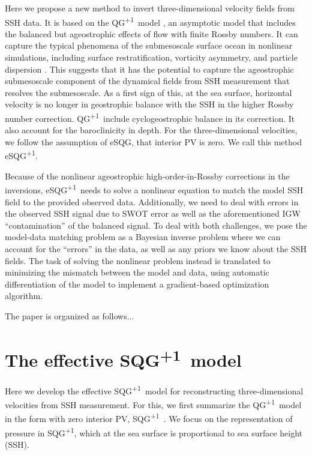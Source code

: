 \documentclass[11pt,letterpaper]{article}
\newcommand{\pl}{\textsuperscript{+1}}
\begin{document}
Here we propose a new method to invert three-dimensional velocity fields from SSH data. It is based on the QG\pl~model \citep{Vallis_96a,MurakiEtAl_99}, an asymptotic model that includes the balanced but ageostrophic effects of flow with finite Rossby numbers. It can capture the typical phenomena of the submesoscale surface ocean in nonlinear simulations, including surface restratification, vorticity asymmetry, and particle dispersion \citep{HakimEtAl_02,MaaloulyEtAl_23,DuEtAl_24}. This suggests that it has the potential to capture the ageostrophic submesoscale component of the dynamical fields from SSH measurement that resolves the submesoscale. As a first sign of this, at the sea surface, horizontal velocity is no longer in geostrophic balance with the SSH in the higher Rossby number correction. QG\pl~include cyclogeostrophic balance in its correction. It also account for the baroclinicity in depth. For the three-dimensional velocities, we follow the assumption of eSQG, that interior PV is zero. We call this method eSQG\pl. 

Because of the nonlinear ageostrophic high-order-in-Rossby corrections in the inversions, eSQG\pl~needs to solve a nonlinear equation to match the model SSH field to the provided observed data. Additionally, we need to deal with errors in the observed SSH signal due to SWOT error as well as the aforementioned IGW ``contamination'' of the balanced signal. To deal with both challenges, we pose the model-data matching problem as a Bayesian inverse problem where we can account for the ``errors'' in the data, as well as any priors we know about the SSH fields. The task of solving the nonlinear problem instead is translated to minimizing the mismatch between the model and data, using automatic differentiation of the model to implement a gradient-based optimization algorithm. 

The paper is organized as follows...

\section{The effective SQG\pl~model}
Here we develop the effective SQG\pl~model for reconstructing three-dimensional velocities from SSH measurement. For this, we first summarize the QG\pl~model in the form with zero interior PV, SQG\pl~\citep{MurakiEtAl_99,HakimEtAl_02,DuEtAl_24}. We focus on the representation of pressure in SQG\pl, which at the sea surface is proportional to sea surface height (SSH). 
\end{document}

